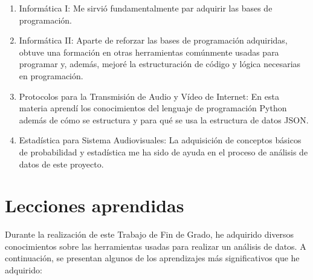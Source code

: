 \documentclass[a4paper, 12pt]{book}
\begin{document}
\begin{enumerate}
  \item Informática I: Me sirvió fundamentalmente par adquirir las bases de programación.
  \item Informática II: Aparte de reforzar las bases de programación adquiridas, obtuve una formación en otras herramientas comúnmente usadas para programar y, además, mejoré la estructuración de código y lógica necesarias en programación.
  \item Protocolos para la Transmisión de Audio y Vídeo de Internet: En esta materia aprendí los conocimientos del lenguaje de programación Python además de cómo se estructura y para qué se usa la estructura de datos JSON.
  \item Estadística para Sistema Audiovisuales: La adquisición de conceptos básicos de probabilidad y estadística me ha sido de ayuda en el proceso de análisis de datos de este proyecto. 
\end{enumerate}


\section{Lecciones aprendidas}
\label{sec:lecciones_aprendidas}

Durante la realización de este Trabajo de Fin de Grado, he adquirido diversos conocimientos sobre las herramientas usadas para realizar un análisis de datos. 
A continuación, se presentan algunos de los aprendizajes más significativos que he adquirido:
\end{document}
